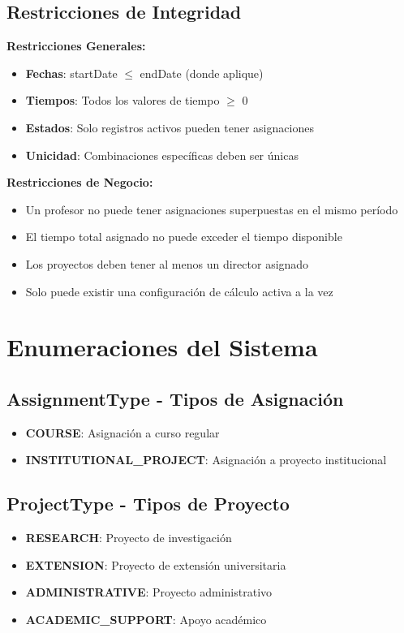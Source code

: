 \documentclass[11pt,a4paper]{article}
\begin{document}
\subsection{Restricciones de Integridad}

\textbf{Restricciones Generales:}
\begin{itemize}
    \item \textbf{Fechas}: startDate $\leq$ endDate (donde aplique)
    \item \textbf{Tiempos}: Todos los valores de tiempo $\geq$ 0
    \item \textbf{Estados}: Solo registros activos pueden tener asignaciones
    \item \textbf{Unicidad}: Combinaciones específicas deben ser únicas
\end{itemize}

\textbf{Restricciones de Negocio:}
\begin{itemize}
    \item Un profesor no puede tener asignaciones superpuestas en el mismo período
    \item El tiempo total asignado no puede exceder el tiempo disponible
    \item Los proyectos deben tener al menos un director asignado
    \item Solo puede existir una configuración de cálculo activa a la vez
\end{itemize}

\newpage

\section{Enumeraciones del Sistema}

\subsection{AssignmentType - Tipos de Asignación}
\begin{itemize}
    \item \textbf{COURSE}: Asignación a curso regular
    \item \textbf{INSTITUTIONAL\_PROJECT}: Asignación a proyecto institucional
\end{itemize}

\subsection{ProjectType - Tipos de Proyecto}
\begin{itemize}
    \item \textbf{RESEARCH}: Proyecto de investigación
    \item \textbf{EXTENSION}: Proyecto de extensión universitaria
    \item \textbf{ADMINISTRATIVE}: Proyecto administrativo
    \item \textbf{ACADEMIC\_SUPPORT}: Apoyo académico
\end{itemize}
\end{document}
